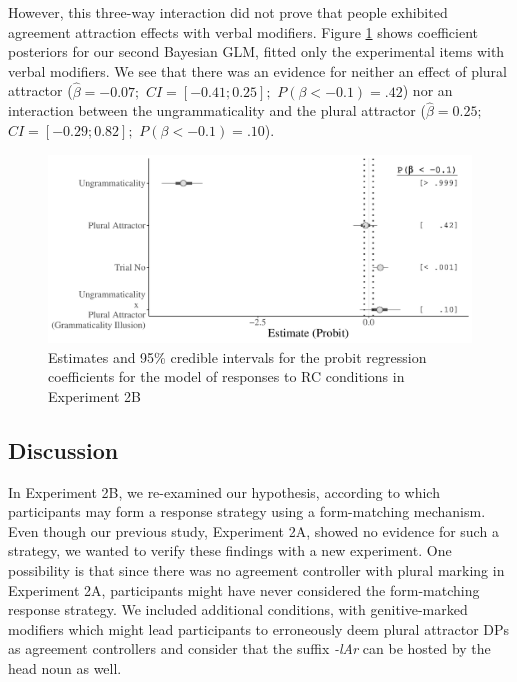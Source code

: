However, this three-way interaction did not prove that people exhibited agreement attraction effects with verbal modifiers. Figure \ref{fig:exp2bRCBayes} shows coefficient posteriors for our second Bayesian GLM, fitted only the experimental items with verbal modifiers. We see that there was an evidence for neither an effect of plural attractor ($\hat{\beta}=-0.07;$ $CI=[-0.41; 0.25];$ $P(\beta< -0.1)=    .42$) nor an interaction between the ungrammaticality and the plural attractor ($\hat{\beta}=0.25;$ $CI=[-0.29; 0.82];$ $P(\beta< -0.1)=    .10$). 

\begin{knitrout}
\color{fgcolor}\begin{figure}[hbt!]

{\centering \includegraphics[width=\linewidth]{figure/exp2bRCBayes-1} 

}

\caption[Estimates and 95\% credible intervals for the probit regression coefficients for the model of responses to RC conditions in Experiment 2B]{Estimates and 95\% credible intervals for the probit regression coefficients for the model of responses to RC conditions in Experiment 2B}\label{fig:exp2bRCBayes}
\end{figure}

\end{knitrout}

\subsection{Discussion}

In Experiment 2B, we re-examined our hypothesis, according to which participants may form a response strategy using a form-matching mechanism. Even though our previous study, Experiment 2A, showed no evidence for such a strategy, we wanted to verify these findings with a new experiment. One possibility is that since there was no agreement controller with plural marking in Experiment 2A, participants might have never considered the form-matching response strategy. We included additional conditions, with genitive-marked modifiers which might lead participants to erroneously deem plural attractor DPs as agreement controllers and consider that the suffix \emph{-lAr} can be hosted by the head noun as well.


